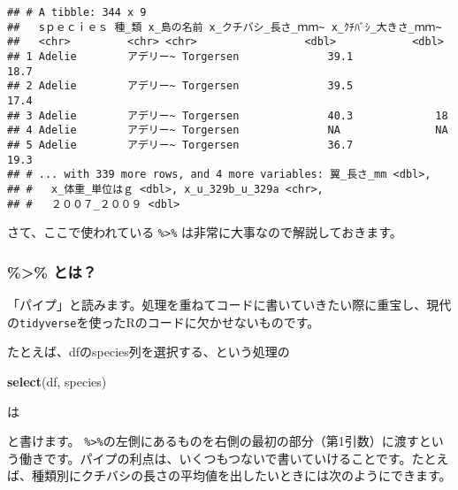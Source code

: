 \documentclass[
  xelatex,ja=standard, b5paper]{bxjsbook}
\newenvironment{Shaded}{\begin{snugshade}}{\end{snugshade}}
\newcommand{\DataTypeTok}[1]{\textcolor[rgb]{0.13,0.29,0.53}{#1}}
\newcommand{\KeywordTok}[1]{\textcolor[rgb]{0.13,0.29,0.53}{\textbf{#1}}}
\newcommand{\NormalTok}[1]{#1}
\newcommand{\OperatorTok}[1]{\textcolor[rgb]{0.81,0.36,0.00}{\textbf{#1}}}
\newcommand{\OtherTok}[1]{\textcolor[rgb]{0.56,0.35,0.01}{#1}}
\newcommand{\StringTok}[1]{\textcolor[rgb]{0.31,0.60,0.02}{#1}}
\begin{document}
\begin{verbatim}
## # A tibble: 344 x 9
##   sｐｅｃｉｅｓ 種_類 x_島の名前 x_クチバシ_長さ_ｍｍ~ x_ｸﾁﾊﾞｼ_大きさ_ｍｍ~
##   <chr>         <chr> <chr>                 <dbl>            <dbl>
## 1 Adelie        アデリー~ Torgersen              39.1             18.7
## 2 Adelie        アデリー~ Torgersen              39.5             17.4
## 3 Adelie        アデリー~ Torgersen              40.3             18  
## 4 Adelie        アデリー~ Torgersen              NA               NA  
## 5 Adelie        アデリー~ Torgersen              36.7             19.3
## # ... with 339 more rows, and 4 more variables: 翼_長さ_mm <dbl>,
## #   x_体重_単位はｇ <dbl>, x_u_329b_u_329a <chr>,
## #   ２００７_２００９ <dbl>
\end{verbatim}

さて、ここで使われている \texttt{\%\textgreater{}\%} は非常に大事なので解説しておきます。

\hypertarget{ux3068ux306f}{%
\subsubsection{\%\textgreater\% とは？}\label{ux3068ux306f}}

「パイプ」と読みます。処理を重ねてコードに書いていきたい際に重宝し、現代の\texttt{tidyverse}を使ったRのコードに欠かせないものです。

たとえば、dfのspecies列を選択する、という処理の

\begin{Shaded}
\begin{Highlighting}[]
\KeywordTok{select}\NormalTok{(df, species)}
\end{Highlighting}
\end{Shaded}

は

\begin{Shaded}
\end{Shaded}

と書けます。 \texttt{\%\textgreater{}\%}の左側にあるものを右側の最初の部分（第1引数）に渡すという働きです。パイプの利点は、いくつもつないで書いていけることです。たとえば、種類別にクチバシの長さの平均値を出したいときには次のようにできます。

\begin{Shaded}
\end{Shaded}
\end{document}
